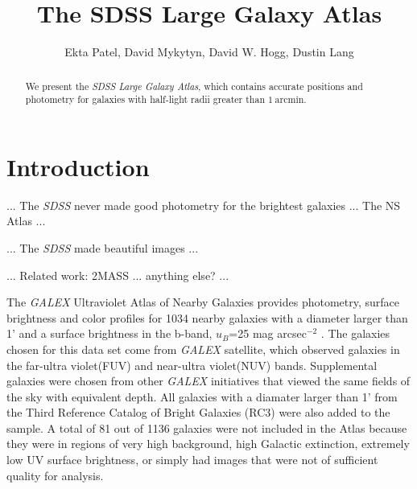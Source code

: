 \documentclass[12pt,preprint,dvipdf]{aastex}
\newcounter{address}
\newcommand{\project}[1]{\textsl{#1}}
\newcommand{\units}[1]{\mathrm{#1}}
\renewcommand{\arcmin}{\units{arcmin}}
\begin{document}
\title{
       The SDSS Large Galaxy Atlas
      }
\author{
        Ekta Patel\altaffilmark{\ref{CCPP}},
        David Mykytyn\altaffilmark{\ref{CCPP}},
        David W. Hogg\altaffilmark{\ref{CCPP},\ref{MPIA},\ref{email}},
        Dustin Lang\altaffilmark{\ref{CMU}}
       }
\setcounter{address}{1}

\begin{abstract}
We present the \project{SDSS Large Galaxy Atlas}, which contains
accurate positions and photometry for galaxies with half-light radii
greater than $1~\arcmin$.
\end{abstract}

\section{Introduction}

... The \project{SDSS} never made good photometry for the brightest galaxies ... The NS Atlas ...

... The \project{SDSS} made beautiful images ...

... Related work:  2MASS ... anything else? ...

The \textit{GALEX} Ultraviolet Atlas of Nearby Galaxies provides photometry, surface brightness and color profiles for 1034 nearby galaxies with a diameter larger than 1' and a surface brightness in the b-band, $u_B$=25 mag arcsec$^{-2}$ . The galaxies chosen for this data set come from \textit{GALEX} satellite, which observed galaxies in the far-ultra violet(FUV) and near-ultra violet(NUV) bands. Supplemental galaxies were chosen from other \textit{GALEX} initiatives that viewed the same fields of the sky with equivalent depth. All galaxies with a diamater larger than 1' from the Third Reference Catalog of Bright Galaxies (RC3) were also added to the sample. A total of 81 out of 1136 galaxies were not included in the Atlas because they were in regions of very high background, high Galactic extinction, extremely low UV surface brightness, or simply had images that were not of sufficient quality for analysis. 
\end{document}
